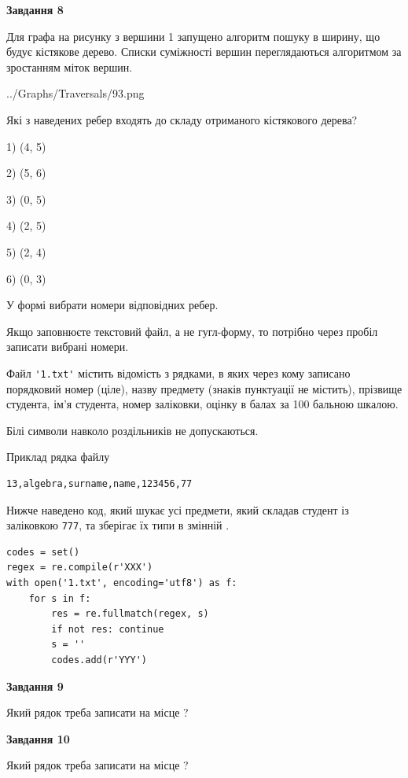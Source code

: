 \documentclass[12pt, ukrainian]{article}
\def\code#1{\Verb!#1!}
\begin{document}
{\begin {large}
{\begin {center}\textbf{Завдання 8}\end {center}}\par
Для графа на рисунку з вершини 1 запущено алгоритм пошуку в ширину, що будує кістякове дерево. Списки суміжності вершин переглядаються алгоритмом за зростанням міток вершин.\par
\begin{center}
	{../Graphs/Traversals/93.png}
\end{center}
\par Які з наведених ребер входять до складу отриманого кістякового дерева?\par
1) (4, 5)\par
2) (5, 6)\par
3) (0, 5)\par
4) (2, 5)\par
5) (2, 4)\par
6) (0, 3)\par
{\vskip 15pt} У формі вибрати номери відповідних ребер.


Якщо заповнюєте текстовий файл, а не гугл-форму, то потрібно через пробіл записа\-ти вибрані номери.\par
\newpage


Файл \code{'1.txt'} містить відомість з рядками, в яких через кому записано поряд\-ковий номер (ціле), назву предмету (знаків пунктуації не містить), прізвище студента, ім'я студента, номер заліковки, оцінку в балах за 100 бальною шкалою.

Білі символи навколо роздільників не допускаються.

Приклад рядка файлу



\begin{verbatim}
13,algebra,surname,name,123456,77
\end{verbatim}


Нижче наведено код, який шукає усі предмети, який складав студент із заліковкою \code{777}, та зберігає їх типи в змінній .



\begin{verbatim}
codes = set()
regex = re.compile(r'XXX')
with open('1.txt', encoding='utf8') as f:
    for s in f:
        res = re.fullmatch(regex, s)
        if not res: continue
        s = ''
        codes.add(r'YYY')
\end{verbatim}


{\begin {center}\textbf{Завдання 9}\end {center}}\par
Який рядок треба записати на місце  ?\par
\vspace{5mm}


{\begin {center}\textbf{Завдання 10}\end {center}}\par
Який рядок треба записати на місце  ?\par


\newpage


\end {large}}
\end{document}
